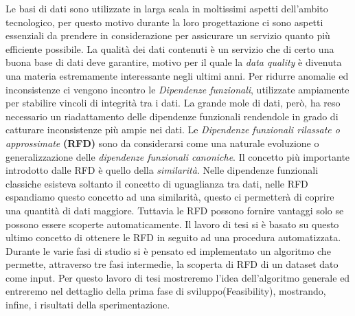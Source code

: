 Le basi di dati sono utilizzate in larga scala in moltissimi aspetti dell'ambito tecnologico, per questo motivo durante la loro progettazione ci sono aspetti essenziali da prendere in considerazione per assicurare un servizio quanto più efficiente possibile.
La qualità dei dati contenuti è un servizio che di certo una buona base di dati deve garantire, motivo per il quale la \emph{data quality} è divenuta una materia estremamente interessante negli ultimi anni. 
Per ridurre anomalie ed inconsistenze ci vengono incontro le \emph{Dipendenze funzionali}, utilizzate ampiamente per stabilire vincoli di integrità tra i dati.
La grande mole di dati, però, ha reso necessario un riadattamento delle dipendenze funzionali rendendole in grado di catturare inconsistenze più ampie nei dati. 
Le \emph{Dipendenze funzionali rilassate o approssimate} \textbf{(RFD)} sono da considerarsi come una naturale evoluzione o generalizzazione delle \emph{dipendenze funzionali canoniche}.
Il concetto più importante introdotto dalle RFD è quello della \emph{similarità}.
Nelle dipendenze funzionali classiche esisteva soltanto il concetto di uguaglianza tra dati, nelle RFD espandiamo questo concetto ad una similarità, questo ci permetterà di coprire una quantità di dati maggiore.
Tuttavia le RFD possono fornire vantaggi solo se possono essere scoperte automaticamente.
Il lavoro di tesi si è basato su questo ultimo concetto di ottenere le RFD in seguito ad una procedura automatizzata.
Durante le varie fasi di studio si è pensato ed implementato un algoritmo che permette, attraverso tre fasi intermedie, la scoperta di RFD di un dataset dato come input.
Per questo lavoro di tesi mostreremo l'idea dell'algoritmo generale ed entreremo nel dettaglio della prima fase di sviluppo(Feasibility), mostrando, infine, i risultati della sperimentazione.